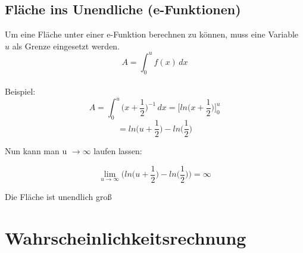 \documentclass[a4paper, 15pt]{article}
\begin{document}
\subsection{Fläche ins Unendliche (e-Funktionen)}
\begin{minipage}{.45\textwidth}
Um eine Fläche unter einer e-Funktion berechnen zu können, muss eine Variable $u$ als Grenze eingesetzt werden.
\begin{equation*}
A = \int_{0}^{u} f(x) \,dx
\end{equation*}\\
\vspace{.2cm}
Beispiel:
\begin{equation*}
A = \int_{0}^{u} \biggl(x+\dfrac{1}{2}\biggl)^{-1} \,dx = \biggl[ln\biggl(x+\dfrac{1}{2}\biggl)\biggl]^u_0
\end{equation*}
\begin{equation*}
= ln\biggl(u+\dfrac{1}{2}\biggl)-ln\biggl(\dfrac{1}{2}\biggl)
\end{equation*}
\end{minipage}
\hspace{1cm}
\begin{minipage}[t]{.45\textwidth}
\begin{center}
Nun kann man u $\longrightarrow \infty$ laufen lassen:
\end{center}
\begin{equation*}
\lim\limits_{u \rightarrow \infty} \Biggl(ln\biggl(u+\dfrac{1}{2}\biggl)-ln\biggl(\dfrac{1}{2}\biggl)\Biggl) = \infty
\end{equation*}
\begin{center}
Die Fläche ist unendlich groß
\end{center}
\end{minipage}
\newpage
\section{Wahrscheinlichkeitsrechnung}
\end{document}
